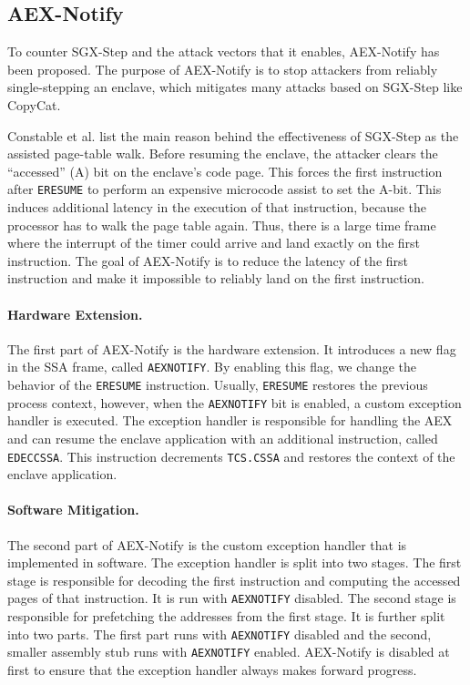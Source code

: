\documentclass{llncs}
\begin{document}
\subsection{AEX-Notify}
\label{sec:aex-notify}

To counter SGX-Step and the attack vectors that it enables, AEX-Notify has been proposed.
The purpose of AEX-Notify is to stop attackers from reliably single-stepping an enclave,
which mitigates many attacks based on SGX-Step like CopyCat.

Constable et al. \cite{ConstableBCXXAK23} list the main reason
behind the effectiveness of SGX-Step as the assisted page-table walk.
Before resuming the enclave, the attacker clears
the ``accessed'' (A) bit on the enclave's code page.
This forces the first instruction after \texttt{ERESUME}
to perform an expensive microcode assist to set the A-bit.
This induces additional latency in the execution of that instruction, because
the processor has to walk the page table again.
Thus, there is a large time frame where the interrupt of the timer could
arrive and land exactly on the first instruction.
The goal of AEX-Notify is to reduce the latency of the first instruction
and make it impossible to reliably land on the first instruction.

\paragraph{Hardware Extension.}
The first part of AEX-Notify is the hardware extension.
It introduces a new flag in the SSA frame, called \texttt{AEXNOTIFY}.
By enabling this flag, we change the behavior of the \texttt{ERESUME} instruction.
Usually, \texttt{ERESUME} restores the previous process context,
however, when the \texttt{AEXNOTIFY} bit is enabled,
a custom exception handler is executed.
The exception handler is responsible for handling the AEX and
can resume the enclave application with an additional instruction, called \texttt{EDECCSSA}.
This instruction decrements \texttt{TCS.CSSA} and restores the context of the enclave application.

\paragraph{Software Mitigation.}
The second part of AEX-Notify is the custom exception handler that is implemented in software.
The exception handler is split into two stages.
The first stage is responsible for decoding the first instruction and
computing the accessed pages of that instruction.
It is run with \texttt{AEXNOTIFY} disabled.
The second stage is responsible for prefetching the addresses from the first stage.
It is further split into two parts.
The first part runs with \texttt{AEXNOTIFY} disabled
and the second, smaller assembly stub runs with \texttt{AEXNOTIFY} enabled.
AEX-Notify is disabled at first to ensure that the exception handler always makes forward progress.
\end{document}
